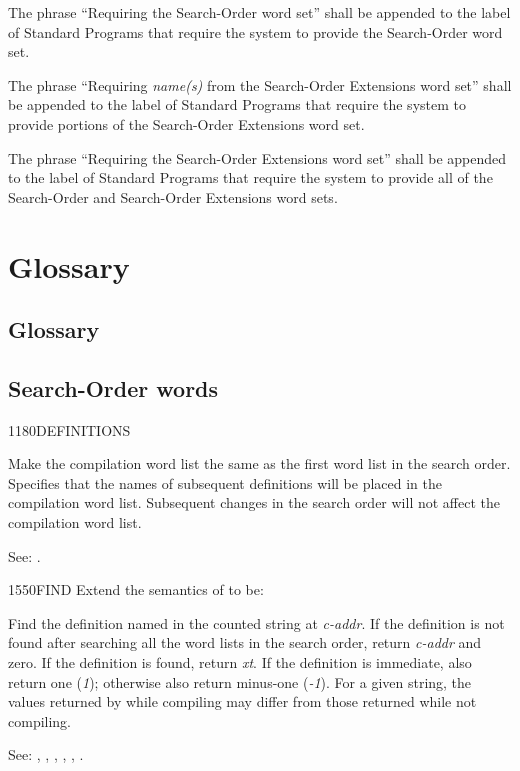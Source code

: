 The phrase ``Requiring the Search-Order word set'' shall be appended
to the label of Standard Programs that require the system to provide
the Search-Order word set.

The phrase ``Requiring \emph{name(s)} from the Search-Order
Extensions word set'' shall be appended to the label of Standard
Programs that require the system to provide portions of the
Search-Order Extensions word set.

The phrase ``Requiring the Search-Order Extensions word set'' shall
be appended to the label of Standard Programs that require the system
to provide all of the Search-Order and Search-Order Extensions word
sets.


\section{Glossary} %

\begin{info}
\subsection{Glossary} %
\end{info}

\subsection{Search-Order words} %

\begin{newword}{1180}{DEFINITIONS}
	\stack{}{}

	Make the compilation word list the same as the first word list
	in the search order. Specifies that the names of subsequent
	definitions will be placed in the compilation word list.
	Subsequent changes in the search order will not affect the
	compilation word list.

\item[See:]
	.
\end{newword}


\begin{newword}{1550}{FIND}
	Extend the semantics of  to be:


	Find the definition named in the counted string at \emph{c-addr}.
	If the definition is not found after searching all the word lists
	in the search order, return \emph{c-addr} and zero. If
	the definition is found, return \emph{xt}. If the definition is
	immediate, also return one (\emph{1}); otherwise also return
	minus-one (\emph{-1}). For a given string, the values returned
	by  while compiling may differ from those returned
	while not compiling.

\item[See:]
	,
	,
	,
	,
	,
	.
\end{newword}


